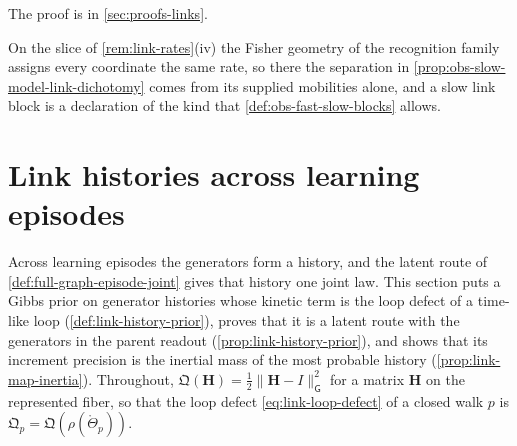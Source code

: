 The proof is in \cref{sec:proofs-links}.

On the slice of \cref{rem:link-rates}(iv) the Fisher geometry of the recognition family assigns every
coordinate the same rate, so there the separation in \cref{prop:obs-slow-model-link-dichotomy} comes
from its supplied mobilities alone, and a slow link block is a declaration of the kind that
\cref{def:obs-fast-slow-blocks} allows.

\section{Link histories across learning episodes}
\label{sec:link-histories}

Across learning episodes the generators form a history, and the latent route of
\cref{def:full-graph-episode-joint} gives that history one joint law. This section puts a Gibbs prior
on generator histories whose kinetic term is the loop defect of a time-like loop
(\cref{def:link-history-prior}), proves that it is a latent route with the generators in the parent
readout (\cref{prop:link-history-prior}), and shows that its increment precision is the inertial mass
of the most probable history (\cref{prop:link-map-inertia}). Throughout,
$\mathfrak Q(\mathbf H)=\tfrac12\lVert\mathbf H-I\rVert_{\mathsf G}^2$ for a matrix $\mathbf H$ on the
represented fiber, so that the loop defect \eqref{eq:link-loop-defect} of a closed walk $p$ is
$\mathfrak Q_p=\mathfrak Q(\rho(\mathring\Theta_p))$.

